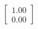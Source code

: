 \documentclass[preview]{standalone}
\begin{document}
\begin{align*}
\begin{bmatrix} 1.00 \\ 0.00 \end{bmatrix}
\end{align*}
\end{document}
